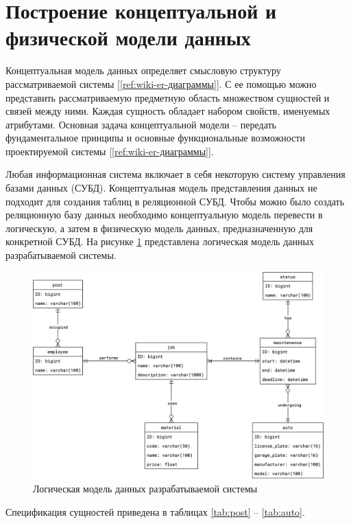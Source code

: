 \documentclass[../nirs.tex]{subfiles}
\begin{document}
\section{Построение концептуальной и физической модели данных}
Концептуальная модель данных определяет смысловую структуру рассматриваемой
системы [\ref{ref:wiki-er-диаграммы}]. С ее помощью можно представить рассматриваемую предметную область
множеством сущностей и связей между ними. Каждая сущность обладает набором
свойств, именуемых атрибутами. Основная задача концептуальной модели -- передать
фундаментальное принципы и основные функциональные возможности проектируемой
системы [\ref{ref:wiki-er-диаграммы}].

Любая информационная система включает в себя некоторую систему управления базами
данных (СУБД). Концептуальная модель представления данных не подходит для
создания таблиц в реляционной СУБД. Чтобы можно было создать реляционную базу
данных необходимо концептуальную модель перевести в логическую, а затем в
физическую  модель данных, предназначенную для конкретной СУБД. На рисунке
\ref{fig:3_1_db_logical} представлена логическая модель данных разрабатываемой
системы.

\clearpage
\begin{landscape}

\begin{figure}[H]
	\centering
	\includegraphics[keepaspectratio,width=\paperwidth]{./images/3_1_db_logical.png}
	\caption{Логическая модель данных разрабатываемой системы}
	\label{fig:3_1_db_logical}
\end{figure}

\end{landscape}
\clearpage

Спецификация сущностей приведена в таблицах \ref{tab:post} --
\ref{tab:auto}.







\end{document}
